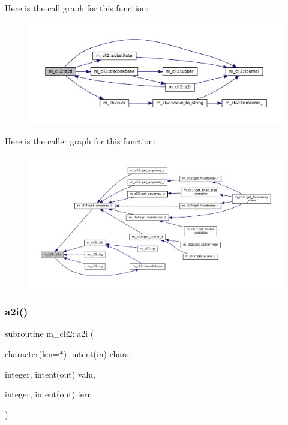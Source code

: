Here is the call graph for this function\+:\nopagebreak
\begin{figure}[H]
\begin{center}
\leavevmode
\includegraphics[width=350pt]{namespacem__cli2_ad9e1de0ea9d2b4ed758b2a76bf143bd2_cgraph}
\end{center}
\end{figure}
Here is the caller graph for this function\+:\nopagebreak
\begin{figure}[H]
\begin{center}
\leavevmode
\includegraphics[width=350pt]{namespacem__cli2_ad9e1de0ea9d2b4ed758b2a76bf143bd2_icgraph}
\end{center}
\end{figure}
\mbox{\label{namespacem__cli2_a0be58233adafc0bf10dfe69300a05b9f}} 
\subsubsection{\texorpdfstring{a2i()}{a2i()}}
{\footnotesize\ttfamily subroutine m\+\_\+cli2\+::a2i (\begin{DoxyParamCaption}\item[{character(len=$\ast$), intent(in)}]{chars,  }\item[{integer, intent(out)}]{valu,  }\item[{integer, intent(out)}]{ierr }\end{DoxyParamCaption})\hspace{0.3cm}{\ttfamily [private]}}



